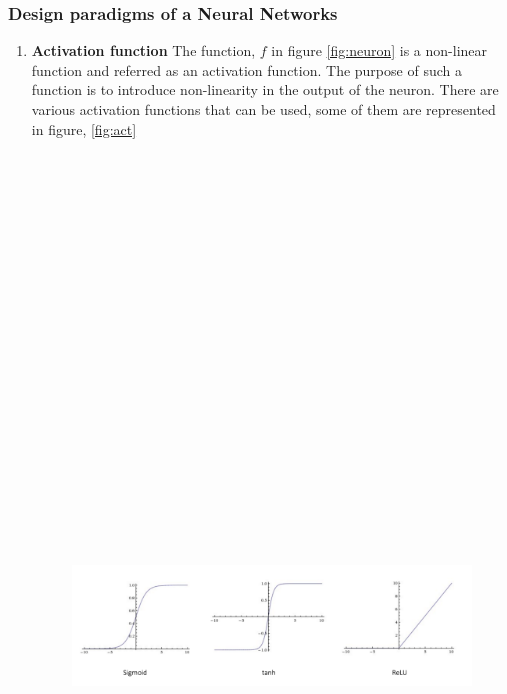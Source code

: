 \subsubsection{Design paradigms of a Neural Networks}
\begin{enumerate}
	\item \textbf{Activation function}
	The function, $f$ in figure \ref{fig:neuron} is a non-linear function and referred as an activation function. The purpose of such a function is to introduce non-linearity in the output of the neuron. There are various activation functions that can be used, some of them are represented in figure, \ref{fig:act}
	\begin{figure}[H]
		\centering
		\includegraphics[width=15cm,height=25cm,keepaspectratio]{files/act.png}

\end{figure}
\end{enumerate}
